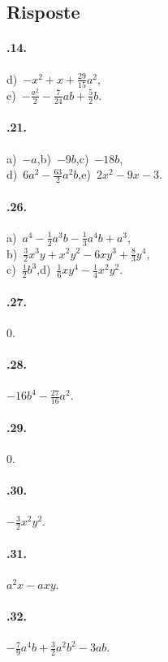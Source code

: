 \subsection{Risposte}
\begin{multicols}{2}
\paragraph{\thechapter.14.} d)~$-x^{2}+x+\frac{29}{15}a^{2}$,\protect\\ e)~$-{\frac{a^{2}}{2}}-\frac{7}{24}ab+\frac{5}{2}b$.
\paragraph{\thechapter.21.} a)~$-a$,\quad b)~$-9b$,\quad c)~$-18b$,\protect\\ d)~$6a^{2}-\frac{63}{2}a^{2}b$,\quad e)~$2x^2-9x-3$.
\paragraph{\thechapter.26.} a)~$a^{4}-\frac{1}{2}a^{3}b-\frac{1}{3}a^{4}b+a^{3}$,\protect\\ b)~$\frac{3}{2}x^{3}y+x^{2}y^{2}-6{xy}^{3}+\frac{8}{3}y^{4}$,\protect\\ c)~$\frac{1}{2}b^{3}$,\quad d)~$\frac{1}{6}xy^{4}-\frac{1}{4}x^{2}y^{2}$.
\paragraph{\thechapter.27.} $0$.
\paragraph{\thechapter.28.} $-16b^{4}-\frac{27}{16}a^{2}$.
\paragraph{\thechapter.29.} $0$.
\paragraph{\thechapter.30.} $-\frac{3}{2}x^{2}y^{2}$.
\paragraph{\thechapter.31.} $a^{2}x-axy$.
\paragraph{\thechapter.32.} $-\frac{7}{9}a^{4}b+\frac{3}{2}a^2b^2-3ab$.

\end{multicols}
